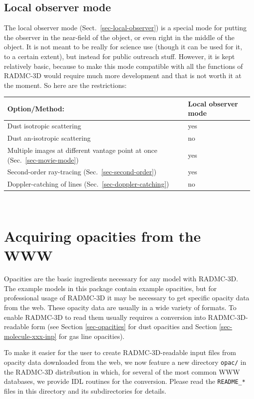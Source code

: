 \documentclass{report}
\begin{document}
\section{Local observer mode}
The local observer mode (Sect.~\ref{sec-local-observer}) is a special mode
for putting the observer in the near-field of the object, or even right in
the middle of the object. It is not meant to be really for science use
(though it can be used for it, to a certain extent), but instead for 
public outreach stuff. However, it is kept relatively basic, because to
make this mode compatible with all the functions of RADMC-3D would require
much more development and that is not worth it at the moment. So here are
the restrictions:\\
\begin{tabular}{ll}
  Option/Method:                               & Local observer mode \\
  \hline
  Dust isotropic scattering    & yes \\
  Dust an-isotropic scattering & no  \\
  Multiple images at different vantage point at once (Sec.~\ref{sec-movie-mode}) & yes \\
  Second-order ray-tracing (Sec.~\ref{sec-second-order}) & yes \\
  Doppler-catching of lines (Sec.~\ref{sec-doppler-catching}) & no 
\end{tabular}\\

\chapter{Acquiring opacities from the WWW}
\label{chap-acquiring-opacities}
%
Opacities are the basic ingredients necessary for any model with
RADMC-3D. The example models in this package contain example opacities, but
for professional usage of RADMC-3D it may be necessary to get specific
opacity data from the web. These opacity data are usually in a wide variety
of formats. To enable RADMC-3D to read them usually requires a conversion
into RADMC-3D-readable form (see Section \ref{sec-opacities} for dust
opacities and Section \ref{sec-molecule-xxx-inp} for gas line opacities).

To make it easier for the user to create RADMC-3D-readable input files
from opacity data downloaded from the web, we now feature a new directory
{\small\tt opac/} in the RADMC-3D distribution in which, for several of
the most common WWW databases, we provide IDL routines for the conversion.
Please read the {\small\tt README\_*} files in this directory and its
subdirectories for details.
\end{document}
